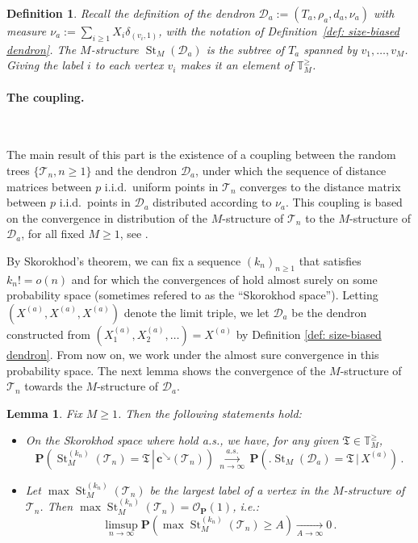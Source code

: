 \documentclass{article}
\newtheorem{lemma}[theorem]{Lemma}
\newtheorem{definition}[theorem]{Definition}
\theoremstyle{remark}
\newcommand{\bT}{\mathbb{T}}
\newcommand{\cO}{\mathcal{O}}
\newcommand{\cv}[1]{\,\underset{#1}{\longrightarrow}\,}
\newcommand{\cT}{\mathcal{T}}
\newcommand{\cD}{\mathcal{D}}
\newcommand{\bc}{\mathbf{c}}
\newcommand{\bP}{\mathbf{P}}
\newcommand{\prob}[1]{\mathbf{P}{\left(#1\right)}}
\newcommand{\probcond}[2]{\mathbf{P}{\left(\left. #1 \,\right|\, #2 \right)}}
\DeclareMathOperator{\St}{St}
\begin{document}
\begin{definition}
Recall the definition of the dendron $\cD_a:=(T_a,\rho_a,d_a,\nu_a)$ with measure $\nu_a := \sum_{i \geq 1} X_i \delta_{(v_i,1)}$, with the notation of Definition~\ref{def: size-biased dendron}. 
The $M$-structure $\St_M(\cD_a)$ is the subtree of $T_a$ spanned by $v_1, \ldots, v_M$. 
Giving the label $i$ to each vertex $v_i$ makes it an element of $\mathbb{T}_M^{\geq}$.
\end{definition}

\paragraph{The coupling.}

\ 

\smallskip

\noindent
The main result of this part is the existence of a coupling between the random trees $\{ \cT_n, n \geq 1 \}$ and the dendron $\cD_a$, under which the sequence of distance matrices between $p$ i.i.d.\ uniform points in $\cT_n$ converges to the distance matrix between $p$ i.i.d.\ points in $\cD_a$ distributed according to $\nu_a$. 
This coupling is based on the convergence in distribution of the $M$-structure of $\cT_n$ to the $M$-structure of $\cD_a$, for all fixed $M \geq 1$, see .

By Skorokhod's theorem, we can fix a sequence $(k_n)_{n \geq 1}$ that satisfies $k_n!=o(n)$ and for which the convergences of  hold almost surely on some probability space (sometimes refered to as the ``Skorokhod space'').
Letting $(X^{(a)}, X^{(a)}, X^{(a)})$ denote the limit triple, we let $\cD_a$ be the dendron constructed from $(X_1^{(a)}, X_2^{(a)}, \ldots) = X^{(a)}$ by Definition \ref{def: size-biased dendron}. 
From now on, we work under the almost sure convergence in this probability space. 
The next lemma shows the convergence of the $M$-structure of $\cT_n$ towards the $M$-structure of $\cD_a$.

\begin{lemma}
\label{lem:proba of a structure}
Fix $M \geq 1$. 
Then the following statements hold:
\begin{itemize}
    \item[(i)] On the Skorokhod space where  hold a.s., we have, for any given $\mathfrak{T}\in \bT_M^{\geq}$,
    \[
        \probcond{ \St_M^{(k_n)}(\cT_n)=\mathfrak{T} }{\bc^\searrow(\cT_n)} 
        \overset{a.s.}{\cv{n\to\infty}} 
        \probcond{\Big. \St_M(\cD_a)=\mathfrak{T} }{X^{(a)}} \,.
    \]
    \item[(ii)] Let $\max \St_M^{(k_n)}(\cT_n)$ be the largest label of a vertex in the $M$-structure of $\cT_n$. 
    Then $\max \St_M^{(k_n)}(\cT_n) = \cO_\bP(1)$, i.e.:
    \[
        \limsup_{n \rightarrow \infty} \prob{\max \St_M^{(k_n)}(\cT_n) \geq A} \underset{A \rightarrow \infty}{\rightarrow} 0 \,.
    \]
\end{itemize}
\end{lemma}
\end{document}
